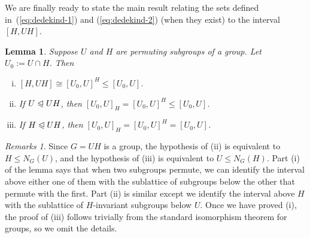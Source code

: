 \documentclass[cm,dissertation]{uhthesis}
\theoremstyle{plain}
\newtheorem{lemma}[theorem]{Lemma}
\theoremstyle{definition}
\theoremstyle{remark}
\newtheorem*{remarks}{Remarks}
\numberwithin{theorem}{section}
\numberwithin{claim}{chapter}
\numberwithin{equation}{section}
\numberwithin{conjecture}{chapter}
\newcommand{\<}{\ensuremath{\langle}}
\renewcommand{\>}{\ensuremath{\rangle}}
\renewcommand{\leq}{\ensuremath{\leqslant}}
\newcommand{\subnormal}{\ensuremath{\trianglelefteqslant}}
\newcommand{\0}{\ensuremath{\mathbf{0}}}
\newcommand{\1}{\ensuremath{\mathbf{1}}}
\newcommand{\2}{\ensuremath{\mathbf{2}}}
\newcommand{\3}{\ensuremath{\mathbf{3}}}
\newcommand{\4}{\ensuremath{\mathbf{4}}}
\newcommand{\5}{\ensuremath{\mathbf{5}}}
\begin{document}
We are finally ready to state the main result relating the sets defined
in~(\ref{eq:dedekind-1}) and (\ref{eq:dedekind-2}) (when they
exist) to the interval $[H, UH]$.
\begin{lemma}
  \label{lemma-wjd-4}
Suppose $U$ and $H$ are permuting subgroups of a group. %
Let $U_0 := U\cap H$.  Then
\begin{enumerate}[(i)]
\item $[H, UH]  \cong  [U_0, U]^H \leq [U_0, U]$.
\item If $U \subnormal UH$, then  $[U_0, U]_H  = [U_0, U]^H \leq [U_0, U]$.
\item If $H \subnormal UH$,  then  $[U_0, U]_H  = [U_0, U]^H = [U_0, U]$.
\end{enumerate}
\end{lemma}
\begin{remarks}
Since $G=UH$ is a group, the hypothesis of (ii) is equivalent to
$H\leq N_G(U)$, and the hypothesis of (iii) is equivalent to $U\leq N_G(H)$.
Part (i) of the lemma says that when two subgroups permute, we can
identify the interval above either one of them with the sublattice of
subgroups below the other that permute with the first.
Part (ii) is similar except we identify the interval above $H$ with
the  sublattice of $H$-invariant subgroups below $U$.  Once we have proved (i), the
proof of (iii) follows trivially from the standard isomorphism theorem for
groups, so we omit the details.
\end{remarks}
\end{document}
